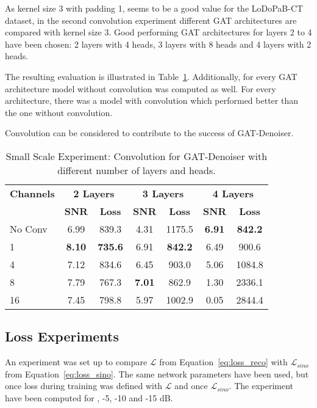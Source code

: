 As kernel size 3 with padding 1, seems to be a good value for the LoDoPaB-CT dataset, 
in the second convolution experiment different GAT architectures are compared with kernel size 3.
Good performing GAT architectures for layers 2 to 4 have been chosen: 2 layers with 4 heads, 3 layers with 8 heads
and 4 layers with 2 heads.

The resulting evaluation is illustrated in Table~\ref{tab:small_convolution_2}.
Additionally, for every GAT architecture model without convolution was computed as well.
For every architecture, there was a model with convolution which performed better than the one without convolution.


\begin{tcolorbox}[colback=red!5!white,colframe=red!75!black]
  Convolution can be considered to contribute to the success of GAT-Denoiser.
\end{tcolorbox}



\begin{table}[H]
  \centering
  \begin{tabular}{l|cc|cc|cc}
    \toprule
    \textbf{Channels } & \multicolumn{2}{c|}{\textbf{2 Layers}} & \multicolumn{2}{c|}{\textbf{3 Layers}} & \multicolumn{2}{c}{\textbf{4 Layers}}  \\
                       & \small \textbf{SNR} & \small \textbf{Loss} & \small \textbf{SNR} & \small \textbf{Loss} & \small \textbf{SNR} & \small \textbf{Loss} \\ 
    \midrule
		No Conv & 6.99  & 839.3 & 4.31   & 1175.5 & \textbf{6.91} & \textbf{842.2}     \\ \hline
		1       & \textbf{8.10}  & \textbf{735.6} & 6.91   & \textbf{842.2} & 6.49 & 900.6     \\ \hline
		4       & 7.12  & 834.6 & 6.45   & 903.0 & 5.06 & 1084.8   \\ \hline
		8       & 7.79  & 767.3 & \textbf{7.01}   & 862.9 & 1.30 & 2336.1    \\ \hline
		16      & 7.45  & 798.8 & 5.97   & 1002.9 & 0.05  & 2844.4   \\
    \midrule
  \end{tabular}

  \caption{Small Scale Experiment: Convolution for GAT-Denoiser with different number of layers and heads.}
  \label{tab:small_convolution_2}
\end{table}


\subsection{Loss Experiments}
An experiment was set up to compare $\mathcal{L}$ from Equation~\ref{eq:loss_reco} 
with $\mathcal{L}_{sino}$ from Equation~\ref{eq:loss_sino}.
The same network parameters have been used, but once loss during training was defined 
with $\mathcal{L}$ and once $\mathcal{L}_{sino}$. The experiment
have been computed for , -5, -10 and -15 dB.

